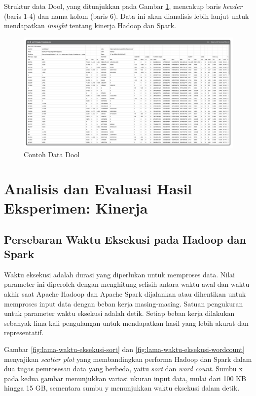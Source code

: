 Struktur data Dool, yang ditunjukkan pada Gambar \ref{fig:data-dool-dalam}, mencakup baris \textit{header} (baris 1-4) dan nama kolom (baris 6). Data ini akan dianalisis lebih lanjut untuk mendapatkan \textit{insight} tentang kinerja Hadoop dan Spark.

\begin{landscape}
\begin{figure}[h]
    \centering
    \includegraphics[width=\linewidth, height=0.5\linewidth]{figures/ch04/data-dool-dalam}
    \caption{Contoh Data Dool}
    \label{fig:data-dool-dalam}
\end{figure}
\end{landscape}

\newpage
\section {Analisis dan Evaluasi Hasil Eksperimen: Kinerja}
\subsection{Persebaran Waktu Eksekusi pada Hadoop dan Spark}
Waktu eksekusi adalah durasi yang diperlukan untuk memproses data. Nilai parameter ini diperoleh dengan menghitung selisih antara waktu awal dan waktu akhir saat Apache Hadoop dan Apache Spark dijalankan atau dihentikan untuk memproses input data dengan beban kerja masing-masing. Satuan pengukuran untuk parameter waktu eksekusi adalah detik. Setiap beban kerja dilakukan sebanyak lima kali pengulangan untuk mendapatkan hasil yang lebih akurat dan representatif.

Gambar \ref{fig:lama-waktu-eksekusi-sort} dan \ref{fig:lama-waktu-eksekusi-wordcount} menyajikan \textit{scatter plot} yang membandingkan performa Hadoop dan Spark dalam dua tugas pemrosesan data yang berbeda, yaitu \textit{sort} dan \textit{word count}. Sumbu x pada kedua gambar menunjukkan variasi ukuran input data, mulai dari 100 KB hingga 15 GB, sementara sumbu y menunjukkan waktu eksekusi dalam detik.


